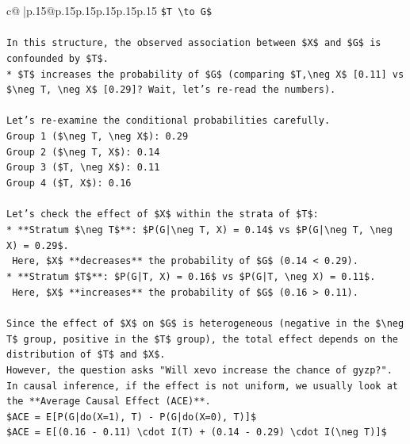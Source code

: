 \documentclass{article}
\begin{document}
{\begin{supertabular}{c@{$\;$}|p{.15\linewidth}@{}p{.15\linewidth}p{.15\linewidth}p{.15\linewidth}p{.15\linewidth}p{.15\linewidth}}
{{{\texttt{\$T \textbackslash{}to G\$} \\
\\ 
\texttt{In this structure, the observed association between \$X\$ and \$G\$ is confounded by \$T\$.} \\
\texttt{*   \$T\$ increases the probability of \$G\$ (comparing \$T,\textbackslash{}neg X\$ {[}0.11{]} vs \$\textbackslash{}neg T, \textbackslash{}neg X\$ {[}0.29{]}? Wait, let's re{-}read the numbers).} \\
\\ 
\texttt{Let's re{-}examine the conditional probabilities carefully.} \\
\texttt{Group 1 (\$\textbackslash{}neg T, \textbackslash{}neg X\$): 0.29} \\
\texttt{Group 2 (\$\textbackslash{}neg T, X\$): 0.14} \\
\texttt{Group 3 (\$T, \textbackslash{}neg X\$): 0.11} \\
\texttt{Group 4 (\$T, X\$): 0.16} \\
\\ 
\texttt{Let's check the effect of \$X\$ within the strata of \$T\$:} \\
\texttt{*   **Stratum \$\textbackslash{}neg T\$**: \$P(G|\textbackslash{}neg T, X) = 0.14\$ vs \$P(G|\textbackslash{}neg T, \textbackslash{}neg X) = 0.29\$.} \\
\texttt{    Here, \$X\$ **decreases** the probability of \$G\$ (0.14 < 0.29).} \\
\texttt{*   **Stratum \$T\$**: \$P(G|T, X) = 0.16\$ vs \$P(G|T, \textbackslash{}neg X) = 0.11\$.} \\
\texttt{    Here, \$X\$ **increases** the probability of \$G\$ (0.16 > 0.11).} \\
\\ 
\texttt{Since the effect of \$X\$ on \$G\$ is heterogeneous (negative in the \$\textbackslash{}neg T\$ group, positive in the \$T\$ group), the total effect depends on the distribution of \$T\$ and \$X\$.} \\
\texttt{However, the question asks "Will xevo increase the chance of gyzp?". In causal inference, if the effect is not uniform, we usually look at the **Average Causal Effect (ACE)**.} \\
\texttt{\$ACE = E{[}P(G|do(X=1), T) {-} P(G|do(X=0), T){]}\$} \\
\texttt{\$ACE = E{[}(0.16 {-} 0.11) \textbackslash{}cdot I(T) + (0.14 {-} 0.29) \textbackslash{}cdot I(\textbackslash{}neg T){]}\$} \\
}}}
\end{supertabular}}
\end{document}
